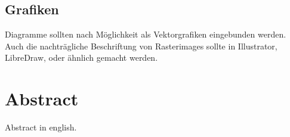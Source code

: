 \section*{Grafiken}
\noindent Diagramme sollten nach Möglichkeit als Vektorgrafiken eingebunden werden. Auch die nachträgliche Beschriftung von Rasterimages sollte in Illustrator, LibreDraw, oder ähnlich gemacht werden.
	\tagmcend
\tagstructend
\let\oldcleardoublepage\cleardoublepage
\renewcommand\cleardoublepage{}

\chapter*{Abstract}
Abstract in english.
	\tagmcend
\tagstructend
\let\cleardoublepage\oldcleardoublepage
\newpage
